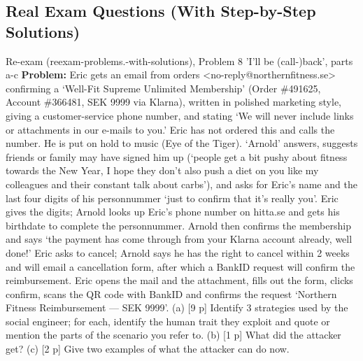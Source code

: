 \documentclass[12pt, a4paper]{article}
\begin{document}
\subsection*{Real Exam Questions (With Step-by-Step Solutions)}

\begin{practicebox}{Re-exam (reexam-problems.-with-solutions), Problem 8 'I'll be (call-)back', parts a-c}
\textbf{Problem:} Eric gets an email from orders <no-reply@northernfitness.se> confirming a `Well-Fit Supreme Unlimited Membership' (Order \#491625, Account \#366481, SEK 9999 via Klarna), written in polished marketing style, giving a customer-service phone number, and stating `We will never include links or attachments in our e-mails to you.' Eric has not ordered this and calls the number. He is put on hold to music (Eye of the Tiger). `Arnold' answers, suggests friends or family may have signed him up (`people get a bit pushy about fitness towards the New Year, I hope they don't also push a diet on you like my colleagues and their constant talk about carbs'), and asks for Eric's name and the last four digits of his personnummer `just to confirm that it's really you'. Eric gives the digits; Arnold looks up Eric's phone number on hitta.se and gets his birthdate to complete the personnummer. Arnold then confirms the membership and says `the payment has come through from your Klarna account already, well done!' Eric asks to cancel; Arnold says he has the right to cancel within 2 weeks and will email a cancellation form, after which a BankID request will confirm the reimbursement. Eric opens the mail and the attachment, fills out the form, clicks confirm, scans the QR code with BankID and confirms the request `Northern Fitness Reimbursement --- SEK 9999'. (a) [9 p] Identify 3 strategies used by the social engineer; for each, identify the human trait they exploit and quote or mention the parts of the scenario you refer to. (b) [1 p] What did the attacker get? (c) [2 p] Give two examples of what the attacker can do now.


\end{practicebox}
\end{document}
